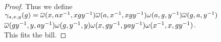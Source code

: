 \begin{proof}
 Thus we define ${\gamma}_{a,x,y}(g) = \overline{\omega}(x, ax^{-1}, xgy^{-1}) \overline{\omega}(a, x^{-1}, xgy^{-1}) \omega(a,g,y^{-1}) \overline{\omega}(g, a, y^{-1})$\\
 $\overline{\omega}(gy^{-1}, y, ay^{-1}) \omega(g, y^{-1}, y) \omega(x, gy^{-1}, yay^{-1}) \omega(x^{-1}, x, gy^{-1})$. \\
 This fits the bill.
\end{proof}